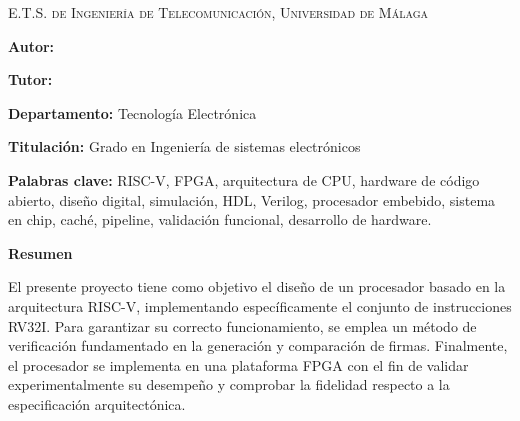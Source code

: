
\pagestyle{fancy}
\renewcommand{\headrulewidth}{0pt}

\begin{center}
	\scshape
	E.T.S. de Ingeniería de Telecomunicación, Universidad de Málaga
\end{center}

\bigskip

\begin{center}
	\Large \scshape
	\textbf{\tfgtitlename}
\end{center}

\bigskip \bigskip \bigskip

\begin{minipage}{\textwidth}

\textbf{Autor:} \tfgauthorname

\medskip

\textbf{Tutor:} \tfgtutorname

\medskip

\textbf{Departamento:} Tecnología Electrónica 

\medskip

\textbf{Titulación:} Grado en Ingeniería de sistemas electrónicos 

\medskip

\textbf{Palabras clave:} RISC-V, FPGA, arquitectura de CPU, hardware de código abierto, diseño digital, simulación, HDL, Verilog, procesador embebido, sistema en chip, caché, pipeline, validación funcional, desarrollo de hardware.

\bigskip \bigskip


\end{minipage}

\begin{center}
	\textbf{Resumen}
\end{center}

El presente proyecto tiene como objetivo el diseño de un procesador basado en la arquitectura RISC-V, implementando específicamente el conjunto de instrucciones RV32I. Para garantizar su correcto funcionamiento, se emplea un método de verificación fundamentado en la generación y comparación de firmas. Finalmente, el procesador se implementa en una plataforma FPGA con el fin de validar experimentalmente su desempeño y comprobar la fidelidad respecto a la especificación arquitectónica.


\blankpage

